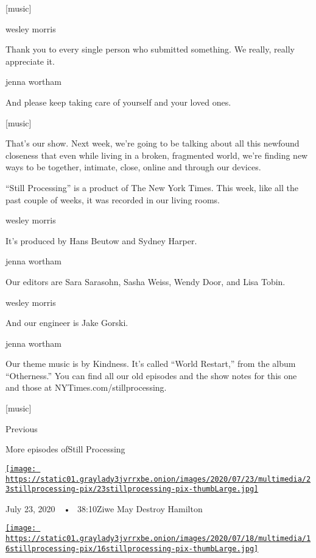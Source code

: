 {[}music{]}

wesley morris

Thank you to every single person who submitted something. We really,
really appreciate it.

jenna wortham

And please keep taking care of yourself and your loved ones.

{[}music{]}

That's our show. Next week, we're going to be talking about all this
newfound closeness that even while living in a broken, fragmented world,
we're finding new ways to be together, intimate, close, online and
through our devices.

``Still Processing'' is a product of The New York Times. This week, like
all the past couple of weeks, it was recorded in our living rooms.

wesley morris

It's produced by Hans Beutow and Sydney Harper.

jenna wortham

Our editors are Sara Sarasohn, Sasha Weiss, Wendy Door, and Lisa Tobin.

wesley morris

And our engineer is Jake Gorski.

jenna wortham

Our theme music is by Kindness. It's called ``World Restart,'' from the
album ``Otherness.'' You can find all our old episodes and the show
notes for this one and those at NYTimes.com/stillprocessing.

{[}music{]}

Previous

More episodes ofStill Processing

\href{https://www.nytimes3xbfgragh.onion/2020/07/23/podcasts/hamilton-ziwe-discomfort.html?action=click\&module=audio-series-bar\&region=header\&pgtype=Article}{\texttt{[image: https://static01.graylady3jvrrxbe.onion/images/2020/07/23/multimedia/23stillprocessing-pix/23stillprocessing-pix-thumbLarge.jpg]}}

July 23, 2020~~•~ 38:10Ziwe May Destroy Hamilton

\href{https://www.nytimes3xbfgragh.onion/2020/07/16/podcasts/reparations-for-aunt-jemima.html?action=click\&module=audio-series-bar\&region=header\&pgtype=Article}{\texttt{[image: https://static01.graylady3jvrrxbe.onion/images/2020/07/18/multimedia/16stillprocessing-pix/16stillprocessing-pix-thumbLarge.jpg]}}

